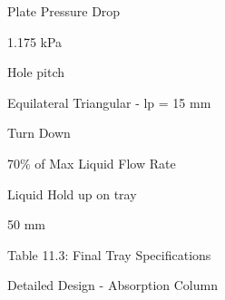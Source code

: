 \documentclass[a4paper,portrait,12pt]{article}
\begin{document}
\begin{flushleft}
Plate Pressure Drop
\end{flushleft}





\begin{flushleft}
1.175 kPa
\end{flushleft}





\begin{flushleft}
Hole pitch
\end{flushleft}





\begin{flushleft}
Equilateral Triangular - lp = 15 mm
\end{flushleft}





\begin{flushleft}
Turn Down
\end{flushleft}





\begin{flushleft}
70\% of Max Liquid Flow Rate
\end{flushleft}





\begin{flushleft}
Liquid Hold up on tray
\end{flushleft}





\begin{flushleft}
50 mm
\end{flushleft}





\begin{flushleft}
Table 11.3: Final Tray Specifications
\end{flushleft}





\begin{flushleft}
\newpage
Detailed Design - Absorption Column
\end{flushleft}
\end{document}
